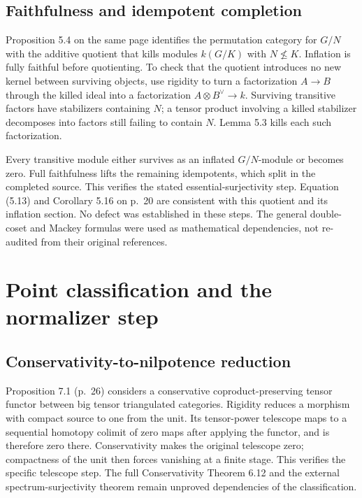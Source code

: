 \documentclass[10pt]{article}
\begin{document}
\subsection*{Faithfulness and idempotent completion}
Proposition 5.4 on the same page identifies the permutation category for \(G/N\) with the additive quotient that kills modules \(k(G/K)\) with \(N\nleq K\). Inflation is fully faithful before quotienting. To check that the quotient introduces no new kernel between surviving objects, use rigidity to turn a factorization \(A\to B\) through the killed ideal into a factorization \(A\otimes B^\vee\to k\). Surviving transitive factors have stabilizers containing \(N\); a tensor product involving a killed stabilizer decomposes into factors still failing to contain \(N\). Lemma 5.3 kills each such factorization.\par
Every transitive module either survives as an inflated \(G/N\)-module or becomes zero. Full faithfulness lifts the remaining idempotents, which split in the completed source. This verifies the stated essential-surjectivity step. Equation (5.13) and Corollary 5.16 on p. 20 are consistent with this quotient and its inflation section. No defect was established in these steps. The general double-coset and Mackey formulas were used as mathematical dependencies, not re-audited from their original references.\par
\section*{Point classification and the normalizer step}
\subsection*{Conservativity-to-nilpotence reduction}
Proposition 7.1 (p. 26) considers a conservative coproduct-preserving tensor functor between big tensor triangulated categories. Rigidity reduces a morphism with compact source to one from the unit. Its tensor-power telescope maps to a sequential homotopy colimit of zero maps after applying the functor, and is therefore zero there. Conservativity makes the original telescope zero; compactness of the unit then forces vanishing at a finite stage. This verifies the specific telescope step. The full Conservativity Theorem 6.12 and the external spectrum-surjectivity theorem remain unproved dependencies of the classification.\par
\end{document}
